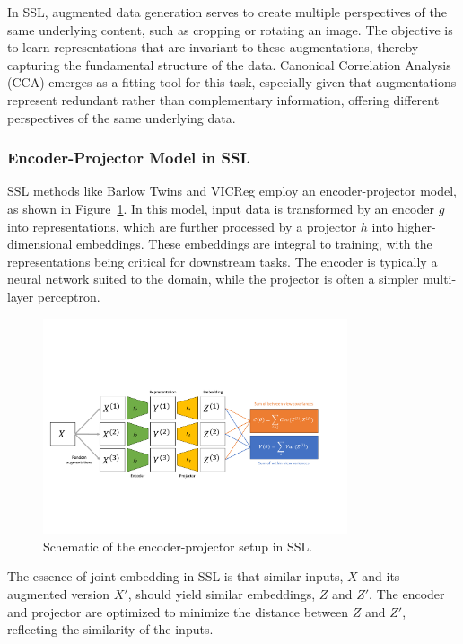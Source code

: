 In SSL, augmented data generation serves to create multiple perspectives of the same underlying content, such as cropping or rotating an image. The objective is to learn representations that are invariant to these augmentations, thereby capturing the fundamental structure of the data. Canonical Correlation Analysis (CCA) emerges as a fitting tool for this task, especially given that augmentations represent redundant rather than complementary information, offering different perspectives of the same underlying data.

\subsubsection{Encoder-Projector Model in SSL}
SSL methods like Barlow Twins and VICReg employ an encoder-projector model, as shown in Figure~\ref{fig:sslschematic}. In this model, input data is transformed by an encoder \( g \) into representations, which are further processed by a projector \( h \) into higher-dimensional embeddings. These embeddings are integral to training, with the representations being critical for downstream tasks. The encoder is typically a neural network suited to the domain, while the projector is often a simpler multi-layer perceptron.

\begin{figure}[ht]
    \centering
    \includegraphics[width=0.8\textwidth]{figures/ssl_schematic}
    \caption{Schematic of the encoder-projector setup in SSL.}
    \label{fig:sslschematic}
\end{figure}

The essence of joint embedding in SSL is that similar inputs, \( X \) and its augmented version \( X' \), should yield similar embeddings, \( Z \) and \( Z' \).
The encoder and projector are optimized to minimize the distance between \( Z \) and \( Z' \), reflecting the similarity of the inputs.


